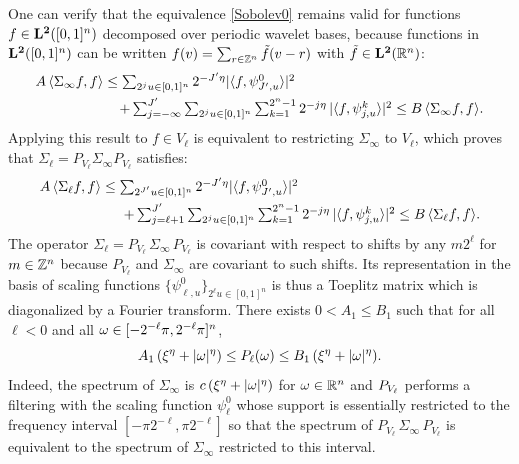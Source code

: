 \documentclass{article}
\begin{document}
One can verify that the equivalence \eqref{Sobolev0} remains valid for 
functions $f \in {\bf L^2}([0,1]^n)$ decomposed over periodic wavelet bases,
because functions in ${\bf L^2}([0,1]^n)$ can be written $f(v) = \sum_{r \in \mathbb Z^n} \tilde f(v-r)$
with $\tilde f \in {\bf L^2}(\mathbb R^n)$:
\begin{align}
  \label{Sobolev2}
&\textstyle{A\, {\langle}\Sigma_\infty f , f {\rangle}\leq 
  \sum_{2^j u \in [0,1]^n} 2^{-{J'} \eta} |{\langle}f , \psi^0_{{J'},u} {\rangle}|^2} \\
  & \qquad \qquad \qquad \textstyle{+
 \sum_{j =-\infty}^{J'} \sum_{2^j u \in [0,1]^n} \sum_{k=1}^{2^n-1}
2^{-j \eta}\, |{\langle}f , \psi^k_{j,u} {\rangle}|^2 \leq 
B\, {\langle}\Sigma_\infty f , f {\rangle}.}
\end{align}
Applying this result to $f \in V_{\ell}$ is equivalent to restricting
$\Sigma_\infty$ to $V_{\ell}$, which proves that $\Sigma_\ell = P_{V_\ell} \Sigma_\infty P_{V_\ell}$ satisfies:
\begin{align}
  \label{Sobolev4}
&\textstyle{A\, {\langle}\Sigma_\ell f , f {\rangle}\leq 
  \sum_{2^{J'} u\in [0,1]^n} 2^{-{J'} \eta} |{\langle}f , \psi^0_{{J'},u} {\rangle}|^2 }
\\ & \qquad \qquad \qquad \textstyle{+
 \sum_{j=\ell+1}^{J'} \sum_{2^j u \in [0,1]^n} \sum_{k=1}^{2^n-1}
2^{-j \eta}\, |{\langle}f , \psi^k_{j,u} {\rangle}|^2 \leq 
B\, {\langle}\Sigma_\ell f , f {\rangle}.}
\end{align}
The operator $\Sigma_\ell = P_{V_\ell} \,\Sigma_\infty\,P_{V_\ell}$
is covariant with respect to shifts by any $m 2^{\ell}$ for $m \in \mathbb Z^n$
because $P_{V_\ell}$ and $\Sigma_\infty$ are covariant to such shifts. 
Its representation in the basis of scaling functions $\{ \psi^0_{\ell,u} \}_{2^{\ell} u \in  [0,1]^n}$ is thus a Toeplitz matrix which is diagonalized by a Fourier transform.
There exists $0 < A_1 \leq B_1$ such that for all $\ell < 0$ and all 
${\omega} \in [-2^{-\ell} \pi , 2^{-\ell} \pi]^n$,
\begin{equation}
    \label{spec-rest}
A_1 \, (\xi^\eta + |{\omega}|^\eta) \leq P_\ell ({\omega}) \leq B_1\, (\xi^\eta + |{\omega}|^\eta) .
\end{equation}
Indeed, the spectrum of $\Sigma_\infty$ is $c\, (\xi^\eta + |{\omega}|^\eta)$ for ${\omega} \in \mathbb R^n$
and $P_{V_\ell}$ performs a filtering with the scaling function $\psi^0_\ell$ whose
support is essentially restricted to the frequency interval $[- \pi 2^{-\ell} , \pi 2^{-\ell}]$ so that the spectrum of $P_{V_\ell} \,\Sigma_\infty\,P_{V_\ell}$ is equivalent
to the spectrum of $\Sigma_\infty$ restricted to this interval. 
\end{document}
